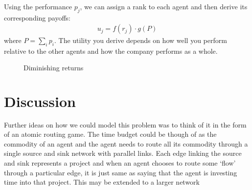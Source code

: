 \documentclass[11pt, a4paper]{article}
\begin{document}
Using the performance $p_j$, we can assign a rank to each agent and then derive its corresponding payoffs:
\begin{align*}
u_j=f(r_j)\cdot g(P)
\end{align*}
where $P=\sum_{i}p_i$. The utility you derive depends on how well you perform relative to the other agents and how the company performs as a whole. 


\begin{figure}
\centering
{}
\caption{Diminishing returns}\label{fig:log}
\end{figure}


\section{Discussion}
Further ideas on how we could model this problem was to think of it in the form of an atomic routing game. The time budget could be though of as the commodity of an agent and the agent needs to route all its commodity through a single source and sink network with parallel links. Each edge linking the source and sink represents a project and when an agent chooses to route some `flow' through a particular edge, it is just same as saying that the agent is investing time into that project. This may be extended to a larger network 
\end{document}
